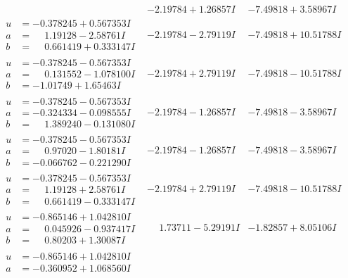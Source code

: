 \documentclass[1p]{elsarticle_modified}
\theoremstyle{definition}
\begin{document}
$$\begin{array}{c|c|c}
 & -2.19784 + 1.26857 I & -7.49818 + 3.58967 I \\ \hline\begin{aligned}
u &= -0.378245 + 0.567353 I \\
a &= \phantom{-}1.19128 - 2.58761 I \\
b &= \phantom{-}0.661419 + 0.333147 I\end{aligned}
 & -2.19784 - 2.79119 I & -7.49818 + 10.51788 I \\ \hline\begin{aligned}
u &= -0.378245 - 0.567353 I \\
a &= \phantom{-}0.131552 - 1.078100 I \\
b &= -1.01749 + 1.65463 I\end{aligned}
 & -2.19784 + 2.79119 I & -7.49818 - 10.51788 I \\ \hline\begin{aligned}
u &= -0.378245 - 0.567353 I \\
a &= -0.324334 - 0.098555 I \\
b &= \phantom{-}1.389240 - 0.131080 I\end{aligned}
 & -2.19784 - 1.26857 I & -7.49818 - 3.58967 I \\ \hline\begin{aligned}
u &= -0.378245 - 0.567353 I \\
a &= \phantom{-}0.97020 - 1.80181 I \\
b &= -0.066762 - 0.221290 I\end{aligned}
 & -2.19784 - 1.26857 I & -7.49818 - 3.58967 I \\ \hline\begin{aligned}
u &= -0.378245 - 0.567353 I \\
a &= \phantom{-}1.19128 + 2.58761 I \\
b &= \phantom{-}0.661419 - 0.333147 I\end{aligned}
 & -2.19784 + 2.79119 I & -7.49818 - 10.51788 I \\ \hline\begin{aligned}
u &= -0.865146 + 1.042810 I \\
a &= \phantom{-}0.045926 - 0.937417 I \\
b &= \phantom{-}0.80203 + 1.30087 I\end{aligned}
 & \phantom{-}1.73711 - 5.29191 I & -1.82857 + 8.05106 I \\ \hline\begin{aligned}
u &= -0.865146 + 1.042810 I \\
a &= -0.360952 + 1.068560 I \\

\end{aligned}
\end{array}$$
\end{document}
